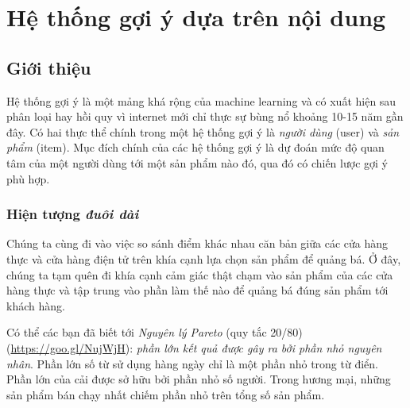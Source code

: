 \chapter{Hệ thống gợi ý dựa trên nội dung}

 
\section{Giới thiệu}
Hệ thống gợi ý là một mảng khá rộng của machine learning và có
xuất hiện sau phân loại hay hồi quy vì internet mới
chỉ thực sự bùng nổ khoảng 10-15 năm gần đây. Có hai thực thể chính trong một
hệ thống gợi ý là \textit{người dùng} (user) và \textit{sản phẩm} (item). Mục đích chính của các hệ thống gợi ý là dự đoán mức độ quan tâm của một người dùng tới một sản phẩm nào đó, qua đó có chiến lược gợi ý phù hợp. 
 
 
\subsection{Hiện tượng \textit{đuôi dài}}

Chúng ta cùng đi vào việc so sánh điểm khác nhau căn bản giữa các {cửa
hàng thực} và {cửa hàng điện tử} trên khía cạnh lựa chọn sản
phẩm để quảng bá. {Ở đây, chúng ta tạm quên đi khía cạnh {cảm giác
thật chạm vào sản phẩm} của các cửa hàng thực và tập trung vào phần làm
thế nào để quảng bá đúng sản phẩm tới khách hàng.}
 
Có thể các bạn đã biết tới \textit{Nguyên lý Pareto} (quy tắc 20/80)
(\url{https://goo.gl/NujWjH}): \textit{phần lớn kết quả được gây ra bởi phần nhỏ
nguyên nhân}. Phần lớn số từ sử dụng hàng ngày chỉ là một phần nhỏ trong
từ điển. Phần lớn của cải được sở hữu bởi phần nhỏ số người. Trong hương
mại, những sản phẩm bán chạy nhất chiếm phần nhỏ trên tổng số sản phẩm.
 
